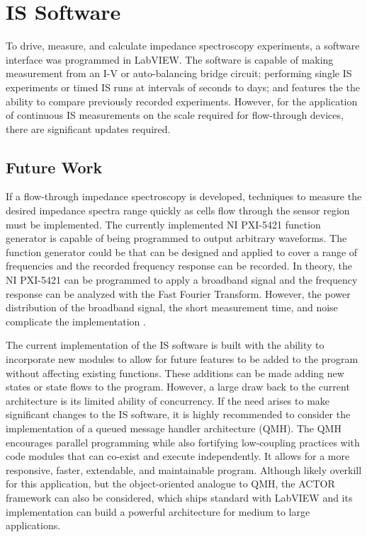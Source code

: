 \section{IS Software}
\par To drive, measure, and calculate impedance spectroscopy experiments, a software interface was programmed in LabVIEW. The software is capable of making measurement from an I-V or auto-balancing bridge circuit; performing single IS experiments or timed IS runs at intervals of seconds to days; and features the the ability to compare previously recorded experiments. However, for the application of continuous IS measurements on the scale required for flow-through devices, there are significant updates required. 

\subsection*{Future Work}

\par If a flow-through impedance spectroscopy is developed, techniques to measure the desired impedance spectra range quickly as cells flow through the sensor region must be implemented. The currently implemented NI PXI-5421 function generator is capable of being programmed to output arbitrary waveforms. The function generator could be  that can be designed and applied to cover a range of frequencies and the recorded frequency response can be recorded. In theory, the NI PXI-5421 can be programmed to apply a broadband signal and the frequency response can be analyzed with the Fast Fourier Transform. However, the power distribution of the broadband signal, the short measurement time, and noise complicate the implementation \cite{sun_digital_2009,sun_broadband_2007,min_broadband_2010}. 

\par The current implementation of the IS software is built with the ability to incorporate new modules to allow for future features to be added to the program without affecting existing functions. These additions can be made adding new states or state flows to the program. However, a large draw back to the current architecture is its limited ability of concurrency. If the need arises to make significant changes to the IS software, it is highly recommended to consider the implementation of a queued message handler architecture (QMH). The QMH encourages parallel programming while also fortifying low-coupling practices with code modules that can co-exist and execute independently. It allows for a more responsive, faster, extendable, and maintainable program. Although likely overkill for this application, but the object-oriented analogue to QMH, the ACTOR framework can also be considered, which ships standard with LabVIEW and its implementation can build a powerful architecture for medium to large applications.

